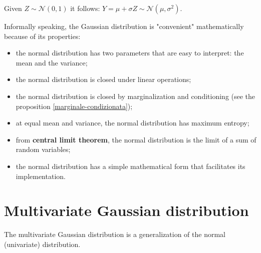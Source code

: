 \begin{oss} \label{normal decomposition}
Given $Z\sim \mathcal{N}(0,1)$ it follows:  $Y=\mu + \sigma Z\sim \mathcal{N}(\mu,\sigma^2)$.
\end{oss}

\begin{oss}
    Informally speaking, the Gaussian distribution is "convenient" mathematically because of its properties:
\begin{itemize}
    \item the normal distribution has two parameters that are easy to interpret: the mean and the variance;
    \item the normal distribution is closed under linear operations;
    \item the normal distribution is closed by marginalization and conditioning (see the proposition \ref{marginale-condizionata});
    \item at equal mean and variance, the normal distribution has maximum entropy;
    \item from \textbf{central limit theorem}, the normal distribution is the limit of a sum of random variables; 
    \item the normal distribution has a simple mathematical form that facilitates its implementation.
\end{itemize}
\end{oss}


\newpage


\section{Multivariate Gaussian distribution}


The multivariate Gaussian distribution is a generalization of the normal (univariate) distribution.



